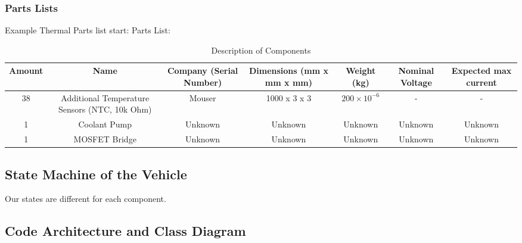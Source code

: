 \subsubsection{Parts Lists}
Example Thermal Parts list start:
Parts List:
\begin{table}[h]
    \centering
    \begin{tabular}{|c|c|c|c|c|c|c|}
    \hline
    \textbf{Amount} & \textbf{Name} & \textbf{Company (Serial Number)} & \textbf{Dimensions (mm x mm x mm)} & \textbf{Weight (kg)} & \textbf{Nominal Voltage} & \textbf{Expected max current} \\
    \hline
    38 & Additional Temperature Sensors (NTC, 10k Ohm) & Mouser & 1000 x 3 x 3 & $200 \times 10^{-6}$ & - & - \\
    \hline
    1 & Coolant Pump & Unknown & Unknown & Unknown & Unknown & Unknown \\
    \hline
    1 & MOSFET Bridge & Unknown & Unknown & Unknown & Unknown & Unknown \\
    \hline
    \end{tabular}
    \caption{Description of Components}
    \label{tab:components}
\end{table}
    

\subsection{State Machine of the Vehicle}

Our states are different for each component.

\subsection{Code Architecture and Class Diagram}

